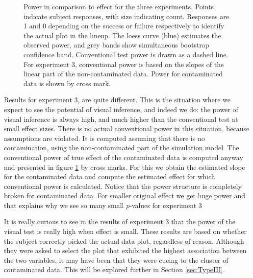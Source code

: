 \documentclass[12pt]{article}
\newcommand{\blue}[1]{{\color{blue} #1}} %
\begin{document}
\begin{figure}[hbtp]
   \centering
       \caption{Power in comparison to effect for the three experiments. Points indicate subject responses, with size indicating count. Responses are 1 and 0 depending on the success or failure respectively to identify the actual plot in the lineup. \blue{The loess curve (blue) estimates the observed power}, and grey bands show simultaneous bootstrap confidence band.  Conventional test power is drawn as a dashed line. For experiment 3, conventional power is based on the slopes of the linear part of the non-contaminated data. Power for contaminated data is shown by cross mark.}
       \label{fig:power_loess_effect}
\end{figure}

Results for experiment 3, are quite different. This is the situation where we expect to see the potential of visual inference, and indeed we do: the power of visual inference is always high, and much higher than the conventional test at small effect sizes. There is no actual conventional power in this situation, because assumptions are violated. It is computed assuming that there is no contamination, using the non-contaminated part of the simulation model. The  conventional power of true effect of the contaminated data is computed anyway and presented in figure \ref{fig:power_loess_effect} by cross marks. For this we obtain the estimated slope for the contaminated data and compute the estimated effect for which conventional power is calculated. Notice that the power structure is completely broken for contaminated data. For smaller original effect we get huge power and that explains why we see so many small $p$-values for experiment 3

It is really curious to see in the results of experiment 3 that the power of the visual test is really high when effect is small. These results are based on whether the subject correctly picked the actual data plot, regardless of reason. Although they were asked to select the plot that exhibited the highest association between the two variables, it may have been that they were cueing to the cluster of contaminated data. This will be explored further in Section \ref{sec:TypeIII}. 
\end{document}
